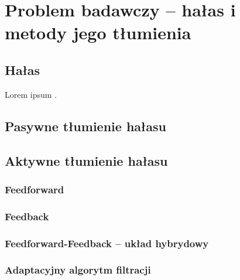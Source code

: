 \chapter{Problem badawczy -- hałas i metody jego tłumienia}
\label{cha:teoria}

\section{Hałas}
\label{sec:hałas}
Lorem ipsum \cite{Pohlmann2010}.
\section{Pasywne tłumienie hałasu}
\label{sec:PNC}

\section{Aktywne tłumienie hałasu}
\label{sec:ANC}

\subsection{Feedforward}
\label{feedforward}

\subsection{Feedback}
\label{feedback}

\subsection{Feedforward-Feedback -- układ hybrydowy}
\label{hybrid}

\subsection{Adaptacyjny algorytm filtracji}
\label{FIRLMS}
